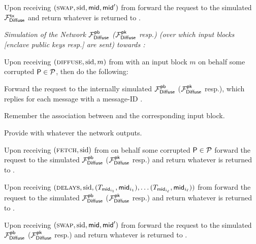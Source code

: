 \begin{simulatorbox}
\begin{cccItemize}[nosep]
        \item Upon receiving $(\textsc{swap}, \mathrm{sid}, \mathsf{mid}, \mathsf{mid}')$ from \adv forward the request to the simulated $\mathcal{F}_{\mathsf{Diffuse}}^{\mathsf{tx}}$ and return whatever is returned to \adv.
    \end{cccItemize}

    \medskip\emph{Simulation of the Network $\mathcal{F}_{\mathsf{Diffuse}}^{\mathsf{pb}}$ ($\mathcal{F}_{\mathsf{Diffuse}}^\mathsf{pk}$ resp.) (over which input blocks [enclave public keys resp.] are sent) towards \adv:}

    \begin{cccItemize}[nosep]
        \item Upon receiving $(\textsc{diffuse}, \mathrm{sid}, m)$ from \adv with an input block $m$ on behalf some corrupted $\mathsf{P} \in \mathcal{P}$, then do the following:
        \begin{cccEnum}[nosep]
            \item Forward the request to the internally simulated $\mathcal{F}_{\mathsf{Diffuse}}^{\mathsf{pb}}$ ($\mathcal{F}_{\mathsf{Diffuse}}^\mathsf{pk}$ resp.), which replies for each message with a message-ID \msgid.
            \item Remember the association between \msgid and the corresponding input block.
            \item Provide \adv with whatever the network outputs.
        \end{cccEnum}

        \item Upon receiving $(\textsc{fetch}, \mathrm{sid})$ from \adv on behalf some corrupted $\mathsf{P} \in \mathcal{P}$ forward the request to the simulated $\mathcal{F}_{\mathsf{Diffuse}}^{\mathsf{pb}}$ ($\mathcal{F}_{\mathsf{Diffuse}}^\mathsf{pk}$ resp.) and return whatever is returned to \adv.

        \item Upon receiving $(\textsc{delays}, \mathrm{sid}, (T_{\mathsf{mid}_{i_1}}, \mathsf{mid}_{i_1}), \ldots (T_{\mathsf{mid}_{i_\ell}}, \mathsf{mid}_{i_\ell}))$ from \adv forward the request to the simulated $\mathcal{F}_{\mathsf{Diffuse}}^{\mathsf{pb}}$ ($\mathcal{F}_{\mathsf{Diffuse}}^\mathsf{pk}$ resp.) and return whatever is returned to \adv.

        \item Upon receiving $(\textsc{swap}, \mathrm{sid}, \mathsf{mid}, \mathsf{mid}')$ from \adv forward the request to the simulated $\mathcal{F}_{\mathsf{Diffuse}}^{\mathsf{pb}}$ ($\mathcal{F}_{\mathsf{Diffuse}}^\mathsf{pk}$ resp.) and return whatever is returned to \adv.
    \end{cccItemize}
\end{simulatorbox}
